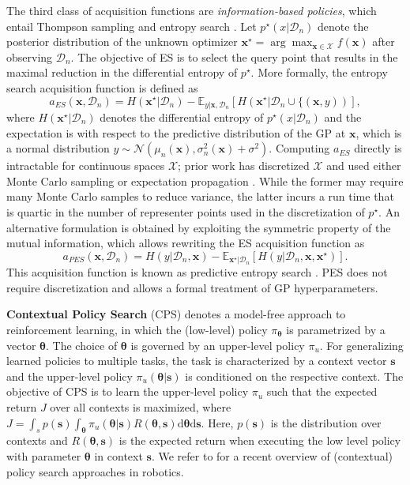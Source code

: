 \documentclass[10pt,letterpaper]{article} %
\def\D{\mathrm{d}}
\begin{document}
The third class of acquisition functions are \emph{information-based policies},
which entail Thompson sampling and entropy search
\citep[ES,][]{villemonteix_informational_2008, hennig_entropy_2012,hernandez-lobato_predictive_2014}.
Let $p^\star(x \vert \mathcal{D}_n)$ denote the
posterior distribution of the unknown optimizer $\mathbf{x}^\star = \arg\max_{\mathbf{x} \in \mathcal{X}} f(\mathbf{x})$  after
observing $\mathcal{D}_n$. The objective of ES is to select the query point that
results in the maximal reduction in the differential entropy of $p^\star$. More
formally, the entropy search acquisition function is defined as
$$ a_{ES}(\mathbf{x}, \mathcal{D}_n)
  = H(\mathbf{x}^\star \vert \mathcal{D}_n) - \mathbb{E}_{y \vert \mathbf{x}, \mathcal{D}_n}
	[H(\mathbf{x}^\star \vert \mathcal{D}_n \cup \{(\mathbf{x}, y))],$$
where $H(\mathbf{x}^\star \vert \mathcal{D}_n)$ denotes the differential entropy
of $p^\star(x \vert \mathcal{D}_n)$ and the expectation is with respect to the
predictive distribution of the GP at $\mathbf{x}$, which is a normal
distribution $y \sim \mathcal{N}(\mu_{n}(\mathbf{x}), \sigma_{n}^2(\mathbf{x}) +
\sigma^2)$. Computing $a_{ES}$ directly is intractable for continuous spaces
$\mathcal{X}$; prior work has discretized $\mathcal{X}$ and used either Monte
Carlo sampling \cite{villemonteix_informational_2008} or expectation propagation
\cite{hennig_entropy_2012}. While the former may require many Monte Carlo
samples to reduce variance, the latter incurs a run time that is quartic in the
number of representer points used in the discretization of $p^\star$. An
alternative formulation is obtained by exploiting the symmetric property of the
mutual information, which allows rewriting the ES acquisition function as
$$ a_{PES}(\mathbf{x}, \mathcal{D}_n)
  = H(y \vert \mathcal{D}_n, \mathbf{x}) - \mathbb{E}_{\mathbf{x}^\star \vert \mathcal{D}_n}
	[H(y \vert \mathcal{D}_n, \mathbf{x}, \mathbf{x}^\star)].$$
This acquisition function is known as predictive entropy search
\citep[PES,][]{hernandez-lobato_predictive_2014}. PES does not require discretization
and allows a formal treatment of GP hyperparameters.


\textbf{Contextual Policy Search} (CPS)
denotes a model-free approach to reinforcement learning,
in which the (low-level) policy $\pi_\mathbf{\theta}$ is parametrized by a vector
$\mathbf{\theta}$. The choice of $\mathbf{\theta}$ is governed by an upper-level policy
$\pi_{u}$. For generalizing learned policies to multiple tasks,
the task is characterized
by a context vector $\mathbf{s}$ and the upper-level policy
$\pi_{u}(\mathbf{\theta}\vert \mathbf{s})$ is conditioned on the respective
context. The objective of CPS is to learn the upper-level policy
$\pi_{u}$ such that the expected return $J$ over all contexts is
maximized, where $J = \int_s p(\mathbf{s}) \int_\mathbf{\theta}
\pi_{u}(\mathbf{\theta}\vert \mathbf{s}) R(\mathbf{\theta}, \mathbf{s}) \D{\mathbf{\theta}
} \D{\mathbf{s}}$. Here, $p(\mathbf{s})$ is the distribution over contexts and
$R(\mathbf{\theta}, \mathbf{s})$ is the expected return when executing the low
level policy with parameter $\mathbf{\theta}$ in context $\mathbf{s}$. We refer to
\citet{deisenroth_survey_2013} for a recent overview of (contextual) policy
search approaches in robotics.
\end{document}
